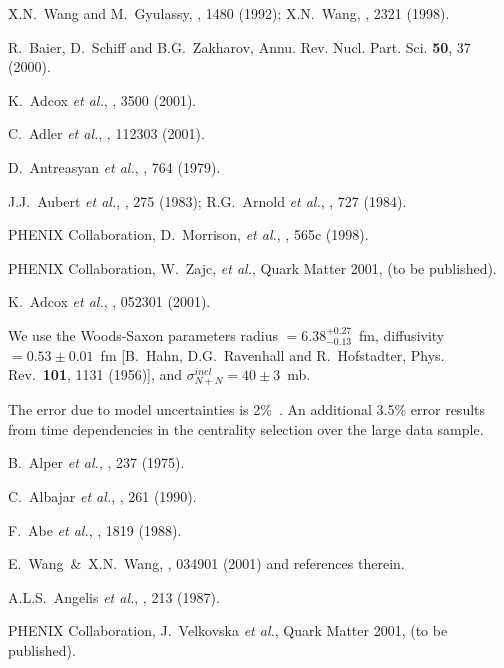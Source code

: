\begin{multicols}{2}
\begin{references}
    X.N.~Wang and M.~Gyulassy, , 1480 
(1992); X.N.~Wang, , 2321 (1998).

 R.~Baier, D.~Schiff and B.G.~Zakharov, Annu. Rev. Nucl.
Part. Sci. {\bf 50}, 37 (2000).

	           K.~Adcox  {\it et al.}, 
		           , 3500 (2001).  

 C.~Adler {\it et al.}, , 112303 (2001).

 D.~Antreasyan {\it et al.}, , 764 (1979).

 J.J.~Aubert {\it et al.}, , 275 (1983);
R.G.~Arnold {\it et al.}, , 727 (1984).

 PHENIX Collaboration, D.~Morrison, {\it et al.},
                           , 565c (1998).

 PHENIX Collaboration, W.~Zajc, {\it et al.},
			   Quark Matter 2001, \NPA{} (to be published).   

	           K.~Adcox  {\it et al.}, 
		  	   , 052301 (2001).

We use the Woods-Saxon 
parameters radius $=6.38^{+0.27}_{-0.13}$~fm, diffusivity $=0.53 \pm
0.01$~fm [B.~Hahn, D.G.~Ravenhall and R.~Hofstadter, 
{Phys. Rev.}~{\bf 101}, 1131 (1956)], and
$\sigma^{inel}_{N+N}=40 \pm 3$~mb.

The error due to model uncertainties is 2\%~\cite{mult}. 
An additional 3.5\% error
results from time dependencies in the centrality selection over the 
large data sample.

 B.~Alper {\it et al.}, , 237 (1975).

              C.~Albajar {\it et al.}, , 261 
(1990).

              F.~Abe {\it et al.},  , 1819 
(1988). 


 E.~Wang~\&~X.N.~Wang,
                    , 034901 (2001) and references therein.

   A.L.S.~Angelis {\it et al.}, , 213 
(1987).


  PHENIX Collaboration, J.~Velkovska {\it et al.},
                     Quark Matter 2001, \NPA{}  (to be published).

\end{references}


\end{multicols}
